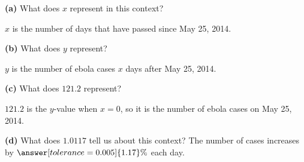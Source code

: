 \documentclass[12pt]{ximera}
\begin{document}
\begin{problem}
\begin{prompt}
\textbf{(a)} What does $x$ represent in this context?
\begin{freeResponse}
\end{freeResponse}
\begin{solution}
$x$ is the number of days that have passed since May 25, 2014.
\end{solution}
\end{prompt}

\begin{prompt}
\textbf{(b)} What does $y$ represent?
\begin{freeResponse}
\end{freeResponse}
\begin{solution}
$y$ is the number of ebola cases $x$ days after May 25, 2014.
\end{solution}
\end{prompt}

\begin{prompt}
\textbf{(c)} What does $121.2$ represent?
\begin{freeResponse}
\end{freeResponse}
\begin{solution}
$121.2$ is the $y$-value when $x = 0$, so it is the number of ebola cases on
May 25, 2014.
\end{solution}
\end{prompt}

\begin{prompt}
\textbf{(d)} What does $1.0117$ tell us about this context? The number of cases
increases by $\answer[tolerance=0.005]{1.17}\%$ each day.
\end{prompt}
\end{problem}
\end{document}
